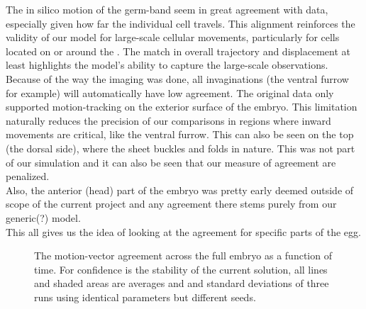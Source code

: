 The in silico motion of the germ-band seem in great agreement with data, especially given how far the individual cell travels. This alignment reinforces the validity of our model for large-scale cellular movements, particularly for cells located on or around the . The match in overall trajectory and displacement at least highlights the model's ability to capture the large-scale observations.\\
Because of the way the imaging was done, all invaginations (the ventral furrow for example) will automatically have low agreement. The original data only supported motion-tracking on the exterior surface of the embryo.  This limitation naturally reduces the precision of our comparisons in regions where inward movements are critical, like the ventral furrow. This can also be seen on the top (the dorsal side), where the sheet buckles and folds in nature. This was not part of our simulation and it can also be seen that our measure of agreement are penalized.\\
Also, the anterior (head) part of the embryo was pretty early deemed outside of scope of the current project and any agreement there stems purely from our generic(?) model.\\

This all gives us the idea of looking at the agreement for specific parts of the egg.



\begin{figure}[H]
    \centering
    \caption{The motion-vector agreement across the full embryo as a function of time. For confidence is the stability of the current solution, all lines and shaded areas are averages and and standard deviations of three runs using identical parameters but different seeds.}
    \label{fig:vector-subsets}
\end{figure}

